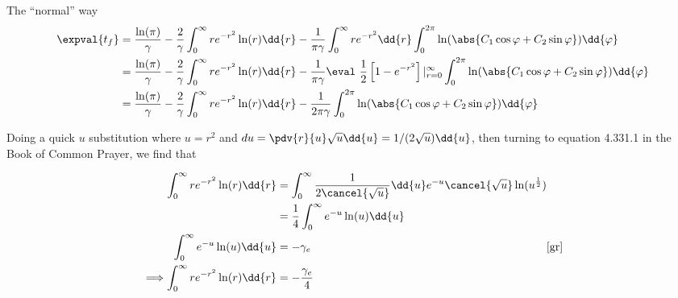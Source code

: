 \begin{answer}
\begin{answerpart}{The ``normal'' way}
    \begin{equation}
      \begin{split}
        \expval{t_f}
        &=
        \frac{\ln(\pi)}{\gamma}
        - 
        \frac{2}{\gamma}
        \int_{0}^{\infty}
        re^{-r^2}
        \ln(r)
        \dd{r}
        -
        \frac{1}{\pi\gamma}
        \int_{0}^{\infty}
        re^{-r^2}
        \dd{r}
        \int_{0}^{2\pi}
        \ln(\abs{C_1\cos{\varphi} + C_2\sin{\varphi}})
        \dd{\varphi}
        \\
        &=
        \frac{\ln(\pi)}{\gamma}
        - 
        \frac{2}{\gamma}
        \int_{0}^{\infty}
        re^{-r^2}
        \ln(r)
        \dd{r}
        -
        \frac{1}{\pi\gamma}
        \eval\ \frac{1}{2}\left[1 - e^{-r^2}\right]|_{r=0}^{\infty}
        \int_{0}^{2\pi}
        \ln(\abs{C_1\cos{\varphi} + C_2\sin{\varphi}})
        \dd{\varphi}
        \\
        &=
        \frac{\ln(\pi)}{\gamma}
        - 
        \frac{2}{\gamma}
        \int_{0}^{\infty}
        re^{-r^2}
        \ln(r)
        \dd{r}
        -
        \frac{1}{2\pi\gamma}
        \int_{0}^{2\pi}
        \ln(\abs{C_1\cos{\varphi} + C_2\sin{\varphi}})
        \dd{\varphi}
        \\
      \end{split}
    \end{equation}

    Doing  a  quick  $u$  substitution  where $u  =  r^2$  and  $du  =
    \pdv{r}{u}\sqrt{u}\dd{u} =  1/(2\sqrt{u})\dd{u}$, then turning to
    equation 4.331.1 in the Book of Common Prayer, we find that

    \begin{equation}
      \begin{alignedat}{3}
        &&\int_{0}^{\infty} re^{-r^2} \ln(r) \dd{r}
        &=
        \int_{0}^{\infty}
        \frac{1}{2\cancel{\sqrt{u}}}
        \dd{u}
        e^{-u}
        \cancel{\sqrt{u}}
        \ln(u^{\frac{1}{2}})
        \\
        &&&=
        \frac{1}{4}
        \int_{0}^{\infty}
        e^{-u}
        \ln(u)
        \dd{u}
        \\
        &&\int_{0}^{\infty}
        e^{-u}
        \ln(u)
        \dd{u}
        &=-\gamma_e
        && \cite[eq 4.331.1]{gr}
        \\
        \implies
        &&\int_{0}^{\infty} re^{-r^2} \ln(r) \dd{r}
        &=-\frac{\gamma_e}{4}
        \\
      \end{alignedat}
    \end{equation}


\end{answerpart}
\end{answer}
